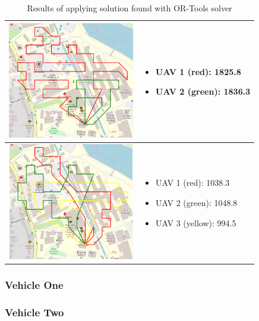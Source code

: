 \begin{table}[h!]
\begin{tabular}{ | c | m{5cm} | }
    \begin{minipage}[c][53mm][c]{.6\textwidth}
      \includegraphics[width=\linewidth, height=51mm]{Chapters/MultiAgentCoverage/MultipleTravellingSalesman/Figs/ORToolsSolns/SpeedEightOne.PNG}
    \end{minipage}
    &
    \begin{itemize}[leftmargin=*]
    \item[] UAV 1 (red): 1825.8
    \item[] UAV 2 (green): 1836.3
    \end{itemize}
    \\
    \hline
    
    \begin{minipage}[c][53mm][c]{.6\textwidth}
      \includegraphics[width=\linewidth, height=51mm]{Chapters/MultiAgentCoverage/MultipleTravellingSalesman/Figs/ORToolsSolns/ThreeRAV.PNG}
    \end{minipage}
    &
    \begin{itemize}[leftmargin=*]
    \item[] UAV 1 (red): 1038.3
    \item[] UAV 2 (green): 1048.8
    \item[] UAV 3 (yellow): 994.5

    \end{itemize}

    \\
    \hline
  \end{tabular}
  \caption{Results of applying solution found with OR-Tools solver}\label{table:NNAlgoResultsRect}
\end{table}


\subsubsection{Vehicle One}

\subsubsection{Vehicle Two}
